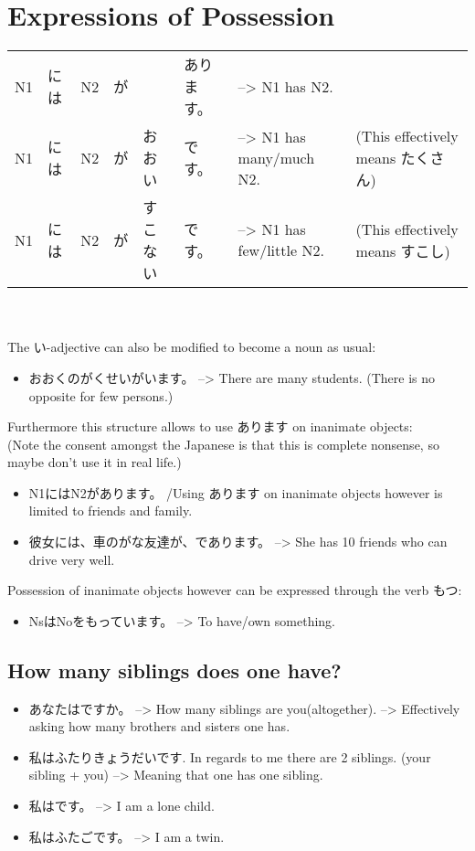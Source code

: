 \documentclass{article}
\newcommand\tab[1][1cm]{\hspace*{#1}}
\begin{document}
\section{Expressions of Possession}
\vspace{1mm}
\tab \begin{tabular}{ l l l l l l l l }
N1&には&N2&が&&あります。& --> N1 has N2. & \\
N1&には&N2&が&おおい&です。& --> N1 has many/much N2. & (This effectively means たくさん) \\
N1&には&N2&が&すこない&です。& --> N1 has few/little N2. & (This effectively means すこし) \\
\end{tabular}
\vspace{2mm} \\ \\
The い-adjective can also be modified to become a noun as usual:
\begin{itemize}
\item おおくのがくせいがいます。 --> There are many students. (There is no opposite for few persons.) \\
\end{itemize}
Furthermore this structure allows to use あります on inanimate objects: \\ 
(Note the consent amongst the Japanese is that this is complete nonsense, so maybe don't use it in real life.)
\begin{itemize}
\item N1にはN2があります。 /Using あります on inanimate objects however is limited to friends and family.
\item 彼女には、車のがな友達が、であります。 --> She has 10 friends who can drive very well.
\end{itemize}
\vspace{3mm}
Possession of inanimate objects however can be expressed through the verb もつ:
\begin{itemize}
\item NsはNoをもっています。 --> To have/own something.
\end{itemize}
\vspace{3mm}
\subsection*{How many siblings does one have?}
\begin{itemize}
\item あなたはですか。 --> How many siblings are you(altogether). --> Effectively asking how many brothers and sisters one has.
\item 私はふたりきょうだいです. In regards to me there are 2 siblings. (your sibling + you) --> Meaning that one has \color{red}one \color{black}sibling.
\item 私はです。 --> I am a lone child.
\item 私はふたごです。 --> I am a twin.
\end{itemize}
\end{document}
